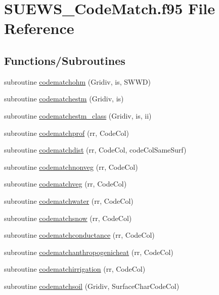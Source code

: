 \hypertarget{_s_u_e_w_s___code_match_8f95}{}\section{S\+U\+E\+W\+S\+\_\+\+Code\+Match.\+f95 File Reference}
\label{_s_u_e_w_s___code_match_8f95}
\subsection*{Functions/\+Subroutines}
\begin{DoxyCompactItemize}
\item 
subroutine \hyperlink{_s_u_e_w_s___code_match_8f95_a18fb6403f079ac99af5a646b8f01e05e}{codematchohm} (Gridiv, is, S\+W\+WD)
\item 
subroutine \hyperlink{_s_u_e_w_s___code_match_8f95_a690f98a34f5c8427a5f02571b24de6fe}{codematchestm} (Gridiv, is)
\item 
subroutine \hyperlink{_s_u_e_w_s___code_match_8f95_a63ba5e040a6e29f1f36d27ca207f02ae}{codematchestm\+\_\+class} (Gridiv, is, ii)
\item 
subroutine \hyperlink{_s_u_e_w_s___code_match_8f95_a835fa5788ff93415350c246bf2f11f2b}{codematchprof} (rr, Code\+Col)
\item 
subroutine \hyperlink{_s_u_e_w_s___code_match_8f95_a3f7412f2da32ab288c3abca74c45c840}{codematchdist} (rr, Code\+Col, code\+Col\+Same\+Surf)
\item 
subroutine \hyperlink{_s_u_e_w_s___code_match_8f95_a368250cd24c62a2bf3f524dbca0b1da4}{codematchnonveg} (rr, Code\+Col)
\item 
subroutine \hyperlink{_s_u_e_w_s___code_match_8f95_ac0f963de4bead7bb4cd003951e8b3592}{codematchveg} (rr, Code\+Col)
\item 
subroutine \hyperlink{_s_u_e_w_s___code_match_8f95_a2b4b50652851ddf7481abfb1e983f637}{codematchwater} (rr, Code\+Col)
\item 
subroutine \hyperlink{_s_u_e_w_s___code_match_8f95_abd63f392ad47ccd2ff25c6065b26779e}{codematchsnow} (rr, Code\+Col)
\item 
subroutine \hyperlink{_s_u_e_w_s___code_match_8f95_aefda6b5266c1784a23433fde9d10cd84}{codematchconductance} (rr, Code\+Col)
\item 
subroutine \hyperlink{_s_u_e_w_s___code_match_8f95_aaf3ba8548fd920324ef2fd7f86e0e0f0}{codematchanthropogenicheat} (rr, Code\+Col)
\item 
subroutine \hyperlink{_s_u_e_w_s___code_match_8f95_a12555b3358f6f448544804f70ba4a8d7}{codematchirrigation} (rr, Code\+Col)
\item 
subroutine \hyperlink{_s_u_e_w_s___code_match_8f95_a2121726d61441ffb4d7f4cfb991b3e48}{codematchsoil} (Gridiv, Surface\+Char\+Code\+Col)
\end{DoxyCompactItemize}


